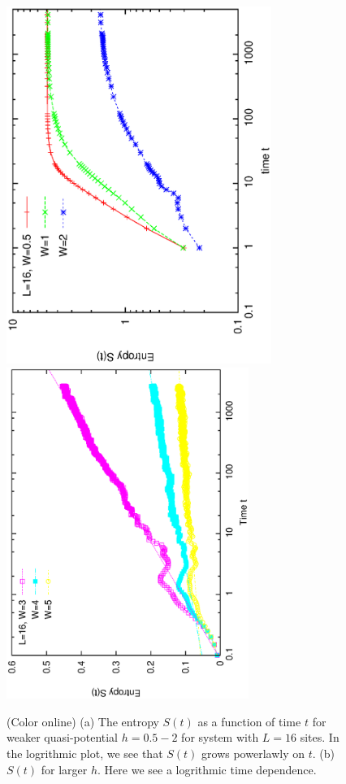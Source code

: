 \documentclass[prl,aps,epsf,showpacs,twocolumn]{revtex4}
\begin{document}
\begin{figure}[b]
  \includegraphics[angle=-90, origin=c,  width=3.4in]{newfig1a.ps}\\
  \vspace{-0.6in}
  \includegraphics[angle=-90,width=3.1in]{newfig1b.ps}\\
  \vspace{0.1in}
  \caption{(Color online) (a) The entropy $S(t)$ as a function of time $t$ for
    weaker quasi-potential $h=0.5-2$ for system with $L=16$ sites.   In the
    logrithmic plot,  we see that $S(t)$ grows powerlawly on $t$.  (b) $S(t)$
    for larger $h$.  Here we see a logrithmic time dependence.
  }
\label{fig2}
\end{figure}
\end{document}
